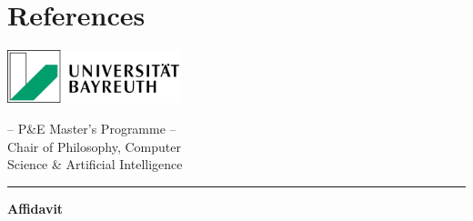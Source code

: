 \documentclass[
  11pt,
  letterpaper,
]{book}
\begin{document}


\chapter*{References}\label{references}


\printbibliography[heading=none]


\backmatter
\printbibliography[title=Bibliography]



\clearpage
\thispagestyle{empty} %

\newpage


\begin{minipage}{0.3\textwidth}
  \includegraphics[width=5cm]{latex/uni-bayreuth-logo.png}
\end{minipage}
\hfill
\begin{minipage}{0.9\textwidth}
  \begin{center}
    -- P\&E Master's Programme --\\
    Chair of Philosophy, Computer\\
    Science \& Artificial Intelligence
  \end{center}
\end{minipage}

\vspace{1.5cm}
\hrule
\vspace{2.5cm}


  \LARGE\textbf{Affidavit}
\vspace{1.5cm}

\center

\normalsize

\end{document}
